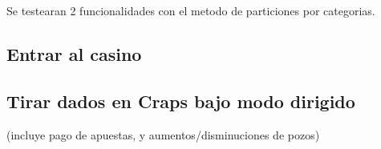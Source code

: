 Se testearan 2 funcionalidades con el metodo de particiones por categorias.


\subsection{Entrar al casino} 




\subsection{Tirar dados en Craps bajo modo dirigido}
(incluye pago de apuestas, y aumentos/disminuciones de pozos)









